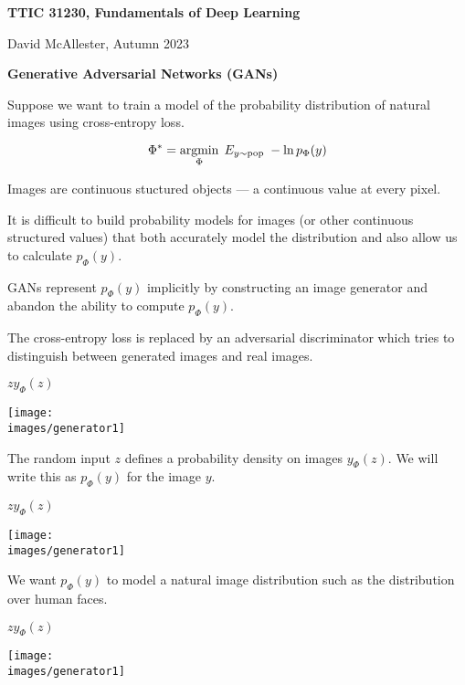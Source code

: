 





{\Huge

  \centerline{\bf TTIC 31230, Fundamentals of Deep Learning}
  \bigskip
  \centerline{David McAllester, Autumn 2023}
  \vfill
  \centerline{\bf Generative Adversarial Networks (GANs)}
\vfill
\vfill



Suppose we want to train a model of the probability distribution of natural images using cross-entropy loss.

\vfill
$$\Phi^* = \operatorname*{argmin}_\Phi \;E_{y \sim \mathrm{pop}}\;-\ln p_\Phi(y)$$

\vfill
Images are continuous stuctured objects --- a continuous value at every pixel.

\vfill
It is difficult to build probability models for images (or other continuous structured values)
that both accurately model the distribution and also allow us to calculate $p_\Phi(y)$.


GANs represent $p_\Phi(y)$ implicitly by constructing an image generator and abandon the ability to compute $p_\Phi(y)$.

\vfill
The cross-entropy loss is replaced by an adversarial discriminator which tries to distinguish between generated images and real images.


\bigskip
\centerline{$z$\hspace{5in}$y_\Phi(z)$}
\centerline{\texttt{[image: \\images/generator1]}}

\bigskip
The random input $z$ defines a probability density on images $y_\Phi(z)$.  We will write this as $p_\Phi(y)$ for the image $y$.


\bigskip
\centerline{$z$\hspace{5in}$y_\Phi(z)$}
\centerline{\texttt{[image: \\images/generator1]}}

\bigskip
We want $p_\Phi(y)$ to model a natural image distribution such as the distribution over human faces.



\bigskip
\centerline{$z$\hspace{5in}$y_\Phi(z)$}
\centerline{\texttt{[image: \\images/generator1]}}

}
